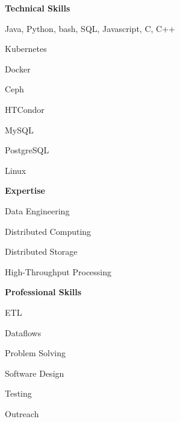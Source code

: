 \documentclass[12pt]{article}
\newcommand{\mynewsubsection}[2]{%
  \medskip
  {\color{colorsection}{#1} {\large \textbf{#2}}}}
\begin{document}
\begin{minipage}[t]{0.29\linewidth}

  \mynewsubsection{\faTasks}{Technical Skills}

  \medskip

  Java, Python, bash, SQL, Javascript, C, C++

  \medskip

  Kubernetes

  \medskip

  Docker

  \medskip

  Ceph

  \medskip

  HTCondor

  \medskip

  MySQL

  \medskip

  PostgreSQL

  \medskip

  Linux

  \bigskip
  \bigskip

  \mynewsubsection{\faUserNinja}{Expertise}

  \medskip
  
  Data Engineering

  \medskip
  
  Distributed Computing

  \medskip

  Distributed Storage

  \medskip

  High-Throughput Processing

  \bigskip
  \bigskip

  \mynewsubsection{\faToolbox}{Professional Skills}

  \medskip

  ETL

  \medskip

  Dataflows

  \medskip

  Problem Solving

  \medskip

  Software Design

  \medskip

  Testing
  
  \medskip

  Outreach

\end{minipage}\hfill
\end{document}

